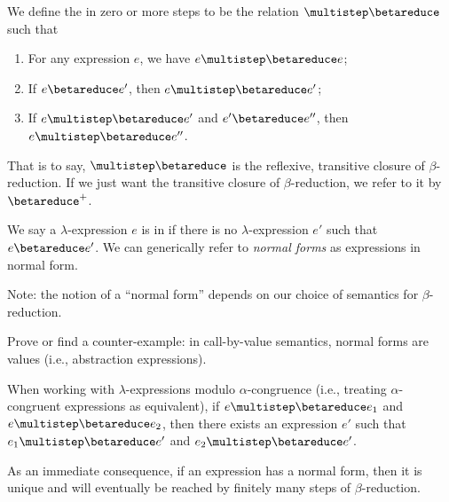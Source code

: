 \begin{node}[Semantics]
\begin{definition}\label{untyped-lambda-000Q}%
We define the  in zero or more steps
to be the relation $\multistep\betareduce$ such that
\begin{enumerate}
\item For any expression $e$, we have $e\multistep\betareduce e$;
\item If $e\betareduce e'$, then $e\multistep\betareduce e'$;
\item If $e\multistep\betareduce e'$ and $e'\betareduce e''$,
  then $e\multistep\betareduce e''$.
\end{enumerate}
That is to say, $\multistep\betareduce$ is the reflexive, transitive closure
of $\beta$-reduction. If we just want the transitive closure of
$\beta$-reduction, we refer to it by $\betareduce^{+}$.
\end{definition}

\begin{definition}\label{untyped-lambda-000O}%
We say a $\lambda$-expression $e$ is in  if there is
no $\lambda$-expression $e'$ such that $e\betareduce e'$. We can
generically refer to \emph{normal forms} as expressions in normal form.

Note: the notion of a ``normal form'' depends on our choice of semantics
for $\beta$-reduction.
\end{definition}

\begin{node}[Exercise]\label{untyped-lambda-000U}%
Prove or find a counter-example: in call-by-value semantics, normal
forms are values (i.e., abstraction expressions).
\end{node}

\begin{theorem}\label{untyped-lambda-000P}%
When working with $\lambda$-expressions modulo $\alpha$-congruence
(i.e., treating $\alpha$-congruent expressions as equivalent), 
if $e\multistep\betareduce e_{1}$ and $e\multistep\betareduce e_{2}$,
then there exists an expression $e'$ such that
$e_{1}\multistep\betareduce e'$ and $e_{2}\multistep\betareduce e'$.
\end{theorem}

\begin{node}\label{untyped-lambda-000W}%
As an immediate consequence, if an expression has a normal form, then it
is unique and will eventually be reached by finitely many steps of
$\beta$-reduction.
\end{node}

\end{node}

